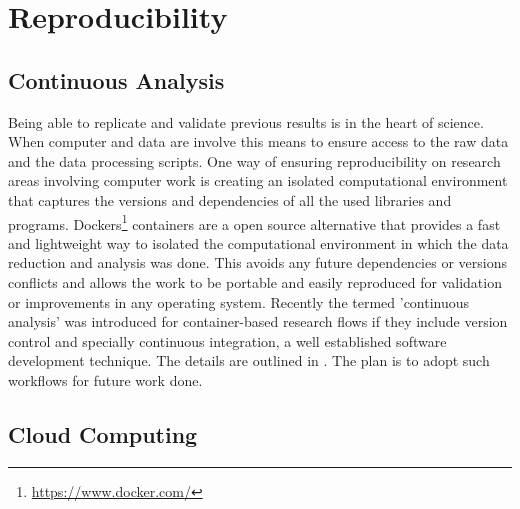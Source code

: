 

\section{Reproducibility}


\subsection{Continuous Analysis}


Being able to replicate and validate previous results is in the heart of science. When computer and data are involve this means to ensure access to the raw data and the data processing scripts. One way of ensuring reproducibility on research areas involving computer work is creating an isolated computational environment that captures the versions and dependencies of all the used libraries and programs. Dockers\footnote{\url{https://www.docker.com/}} containers are a open source alternative that provides a fast and lightweight way to isolated the computational environment in which the data reduction and analysis was done. This  avoids any future dependencies or versions conflicts and allows the work to be portable and easily reproduced for validation or improvements in any operating system. Recently the termed 'continuous analysis' was introduced for container-based research flows if they include version control and specially continuous integration, a well established software development technique. The details are outlined in \cite{Beaulieu-Jones056473}. The plan is to adopt such workflows for future work done.   

\subsection{Cloud Computing}

